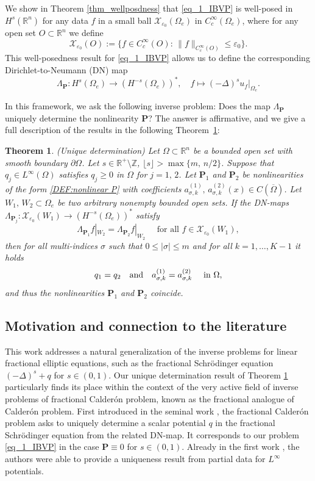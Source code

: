 \documentclass [oneside,11pt] {amsart}
\newcommand{\floor}[1]{\lfloor #1 \rfloor}
\numberwithin{equation}{section}
\newtheorem{theorem}{Theorem}[section]
\newcommand{\R}{\mathbb{R}}
\newcommand{\p}{\partial}
\begin{document}
We show in Theorem \ref{thm_wellposdness} that \eqref{eq_1_IBVP} is well-posed in $H^s(\R^n)$ for any data $f$ in a small ball $\mathcal{X}_{\varepsilon_0}(\Omega_e)$ in $C^\infty_c(\Omega_e)$, where for any open set $O\subset \mathbb R^n$ we define 
\[
\mathcal{X}_{\varepsilon_0}(O):=\{f\in C^\infty_c(O):\,\|f\|_{C^\infty_c(O)}\le\varepsilon_0\}.
\]
This well-posedness result for \eqref{eq_1_IBVP} allows us to define the corresponding Dirichlet-to-Neumann (DN) map 
$$
\Lambda_{\mathbf{P}}: H^{s}(\Omega_e)\rightarrow (H^{-s}(\Omega_e))^*,\quad  f\mapsto  (-\Delta)^s u_f|_{\Omega_e}.
$$

In this framework, we ask the following inverse problem: Does the map $\Lambda_{\mathbf{P}}$ uniquely determine the nonlinearity $\mathbf P$? The answer is affirmative, and we give a full description of the results in the following Theorem~\ref{thm_main}:

\begin{theorem}\label{thm_main}(Unique determination)
Let $\Omega\subset\R^n$ be a bounded open set with smooth 
boundary $\p\Omega$. Let $s\in \R^+\setminus \mathbb{Z}$, $\floor{s}>\max\{m,\,n/2\}$.
Suppose that $q_j\in L^\infty(\Omega)$ satisfies $q_j\geq 0$ in $\Omega$ for $j=1,\,2$.
Let $\mathbf{P}_1$ and $\mathbf{P}_2$ be nonlinearities of the form \eqref{DEF:nonlinear P} with coefficients $a_{\sigma,k}^{(1)},\, a_{\sigma,k}^{(2)}(x) \in C (\overline\Omega)$. Let $W_1,\, W_2\subset\Omega_e$ be two arbitrary nonempty bounded open sets. If the DN-maps $\Lambda_{\mathbf{P}_j}: \mathcal{X}_{\varepsilon_0}(W_1)\rightarrow (H^{-s}(\Omega_e))^*$ satisfy
\[
\Lambda_{\mathbf{P}_1}f|_{W_2} = \Lambda_{\mathbf{P}_2}f|_{W_2} \quad \mbox{ for all } f \in \mathcal{X}_{\varepsilon_0}(W_1), 
\]
then for all multi-indices $\sigma$ such that $0\le |\sigma|\le m$ and for all $k=1,\ldots, K-1$ it holds
$$	 
q_1=q_2\quad\hbox{and}\quad	a_{\sigma,k}^{(1)} = a_{\sigma,k}^{(2)} \quad \hbox{ in }\Omega,
$$ 
and thus the nonlinearities $\mathbf P_1$ and $\mathbf P_2$ coincide.
\end{theorem}

\subsection{Motivation and connection to the literature}
This work addresses a natural generalization of the inverse problems for linear fractional elliptic equations, such as the fractional Schr\"odinger equation $(-\Delta)^s+q$ for $s\in (0,1)$. Our unique determination result of Theorem \ref{thm_main} particularly finds its place within the context of the very active field of inverse problems of fractional Calder\'on problem,  known as the fractional analogue of Calder\'on problem. First introduced in the seminal work \cite{GSU20}, the fractional Calder\'on problem asks to uniquely determine a scalar potential $q$ in the fractional Schr\"odinger equation from the related DN-map. It corresponds to our problem \eqref{eq_1_IBVP} in the case $\mathbf P \equiv 0$ for $s\in (0,1)$. Already in the first work \cite{GSU20}, the authors were able to provide a uniqueness result from partial data for $L^\infty$ potentials. 
\end{document}
